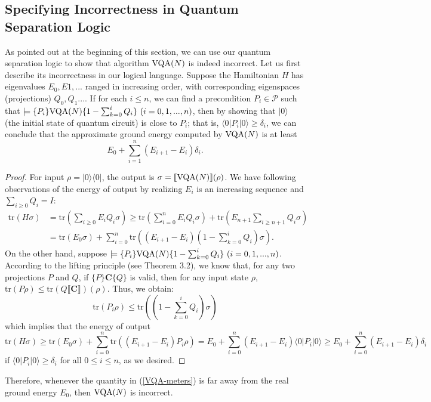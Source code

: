 \documentclass[conference,compsoc, 10pt]{IEEEtran}
\newcommand {\cP } {{\mathcal{P}}}
\newcommand {\id } {{I}}
\newcommand {\tr } {{\mathrm{tr}}}
\newcommand {\prog } {{\mathbf{C}}}
\newcommand {\sem}[1] {\llbracket#1\rrbracket}
\def\>{\ensuremath{\rangle}}
\def\<{\ensuremath{\langle}}
\begin{document}
\begin{appendices}
		\subsection{Specifying Incorrectness in Quantum Separation Logic}
		
		As pointed out at the beginning of this section, we can use our quantum separation logic to show that algorithm ${\rm VQA}(N)$ is indeed incorrect. Let us first describe its incorrectness in our logical language.  
		Suppose the Hamiltonian $H$ has eigenvalues $E_0,E1,...$ ranged in increasing order, with corresponding eigenspaces (projections) $Q_0, Q_1...$. 
		If for each $i\leq n$, we can find a  precondition $P_i\in\cP$ such that $\models\{P_i\} {\rm VQA}(N) \{1-\sum_{k=0}^{i}Q_i\}\ (i=0,1,...,n)$, then by showing that $|0\>$ (the initial state of quantum circuit) is close to $P_i$; that is, $\<0|P_i|0\> \ge \delta_i$, we can conclude that the approximate ground energy computed by ${\rm VQA}(N)$ is at least
		\begin{equation}E_0 + \sum_{i=1}^{n}(E_{i+1}-E_{i})\delta_i.\end{equation}
		\begin{proof}
			For input $\rho = |0\>\<0|$, the output is $\sigma = \sem{{\rm VQA}(N)}(\rho)$. We have following observations of the energy of output by realizing $E_i$ is an increasing sequence and $\sum_{i\ge 0}Q_i = \id$:
			\begin{align*}
			\tr(H\sigma) &= \tr\left(\sum_{i\ge 0}E_iQ_i\sigma\right) \ge \tr\left(\sum_{i= 0}^nE_iQ_i\sigma\right) + \tr\left(E_{n+1}\sum_{i\ge n+1}Q_i\sigma\right) \\
			&= \tr(E_0\sigma) + \sum_{i=0}^n\tr\left((E_{i+1}-E_i)\left(1-\sum_{k=0}^iQ_i\right)\sigma\right).
			\end{align*}
			On the other hand, suppose $\models\{P_i\} {\rm VQA}(N) \{1-\sum_{k=0}^{i}Q_i\}\ (i=0,1,...,n)$. According to the lifting principle (see \cite{ZYY19} Theorem 3.2), we know that, for any two projections $P$ and $Q$, if $\{P\}\prog\{Q\}$ is valid, then for any input state $\rho$, $\tr(P\rho)\le\tr(Q\sem{\prog})(\rho)$. Thus, we obtain:
			$$\tr(P_i\rho)\le\tr\left(\left(1-\sum_{k=0}^{i}Q_i\right)\sigma\right)$$
			which implies that the energy of output
			$$\tr(H\sigma) \ge \tr(E_0\sigma) + \sum_{i=0}^n\tr\left((E_{i+1}-E_i)P_i\rho\right) = E_0 + \sum_{i=0}^n(E_{i+1}-E_i)\<0|P_i|0\>\ge E_0 + \sum_{i=0}^n(E_{i+1}-E_i)\delta_i$$
			if $\<0|P_i|0\>\ge\delta_i$ for all $0\le i\le n$, as we desired.
		\end{proof} 
		Therefore, whenever the quantity in (\ref{VQA-meters}) is far away from the real ground energy $E_0$, then ${\rm VQA}(N)$ is incorrect.
		

\end{appendices}
\end{document}
